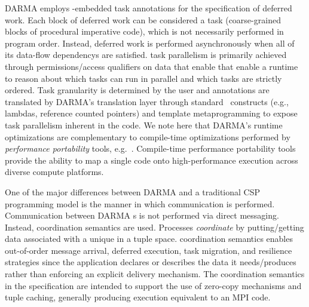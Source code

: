 \gls{DARMA} employs \CC-embedded task annotations for the specification of \gls{deferred
work}. Each block of \gls{deferred work} can be considered a task (coarse-grained blocks of 
\gls{procedural} \gls{imperative} code),  which is not necessarily performed in program order.   Instead,
\gls{deferred work} is performed asynchronously when all of its \glspl{data-flow dependency} are
satisfied.  \Gls{task parallelism} is primarily achieved through permissions/access qualifiers
on data that enable that enable a runtime to reason about which tasks can run in parallel and which tasks are strictly ordered.
Task granularity is determined by the user and annotations are translated by \gls{DARMA}'s \gls{translation
layer} through standard \CC\ constructs (e.g., \glspl{lambda}, \glspl{reference counted pointer}) and \gls{template metaprogramming} to
expose \gls{task parallelism} inherent in the code.
We note here that \gls{DARMA}'s runtime optimizations are complementary to
compile-time optimizations performed by \emph{performance
portability} tools, e.g.~\cite{Kokkos,RAJA,TiDA}.  Compile-time performance
portability tools provide the ability to map a
single code onto high-performance execution across diverse compute platforms.


One of the major differences between \gls{DARMA} and a traditional \gls{CSP}
\gls{programming model} is the manner in which communication is performed.  
Communication between \gls{DARMA} s is not performed via direct messaging.
Instead, \gls{coordination semantics} are used.  Processes \emph{coordinate} by putting/getting
data associated with a unique  in a \gls{tuple space}.  
\Gls{coordination semantics} enables out-of-order message arrival, deferred
execution, task migration, and resilience strategies 
since the application declares or describes the data it needs/produces rather than enforcing an explicit delivery mechanism.
The coordination semantics in the specification are intended to support the use of \gls{zero-copy} mechanisms and tuple caching,
generally producing execution equivalent to an MPI  code. 

